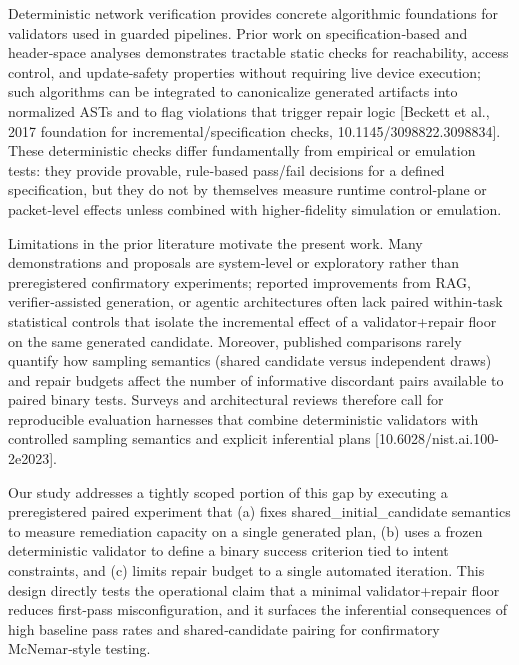 \documentclass[conference]{IEEEtran}
\begin{document}
Deterministic network verification provides concrete algorithmic foundations for validators used in guarded pipelines. Prior work on specification‑based and header‑space analyses demonstrates tractable static checks for reachability, access control, and update‑safety properties without requiring live device execution; such algorithms can be integrated to canonicalize generated artifacts into normalized ASTs and to flag violations that trigger repair logic [Beckett et al., 2017 foundation for incremental/specification checks, 10.1145/3098822.3098834]. These deterministic checks differ fundamentally from empirical or emulation tests: they provide provable, rule‑based pass/fail decisions for a defined specification, but they do not by themselves measure runtime control‑plane or packet‑level effects unless combined with higher‑fidelity simulation or emulation.

Limitations in the prior literature motivate the present work. Many demonstrations and proposals are system‑level or exploratory rather than preregistered confirmatory experiments; reported improvements from RAG, verifier‑assisted generation, or agentic architectures often lack paired within‑task statistical controls that isolate the incremental effect of a validator+repair floor on the same generated candidate. Moreover, published comparisons rarely quantify how sampling semantics (shared candidate versus independent draws) and repair budgets affect the number of informative discordant pairs available to paired binary tests. Surveys and architectural reviews therefore call for reproducible evaluation harnesses that combine deterministic validators with controlled sampling semantics and explicit inferential plans [10.6028/nist.ai.100-2e2023].

Our study addresses a tightly scoped portion of this gap by executing a preregistered paired experiment that (a) fixes shared\_initial\_candidate semantics to measure remediation capacity on a single generated plan, (b) uses a frozen deterministic validator to define a binary success criterion tied to intent constraints, and (c) limits repair budget to a single automated iteration. This design directly tests the operational claim that a minimal validator+repair floor reduces first‑pass misconfiguration, and it surfaces the inferential consequences of high baseline pass rates and shared‑candidate pairing for confirmatory McNemar‑style testing.
\end{document}
